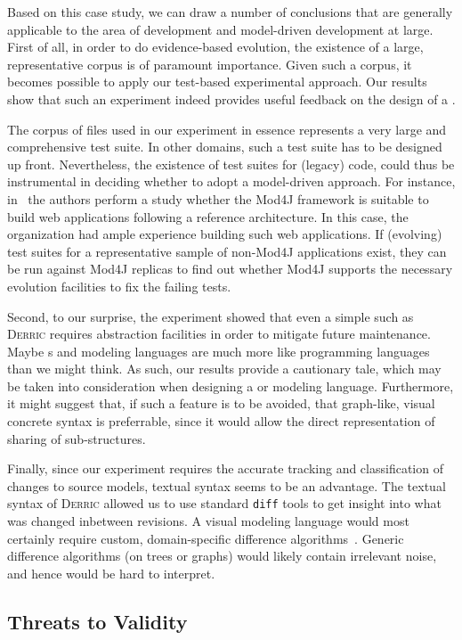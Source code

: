 \documentclass[a4paper]{llncs}
\def\derric{\textsc{Derric}\xspace}
\newcommand{\DSL}{\textsmaller{DSL}\xspace}
\begin{document}
Based on this case study, we can draw a number of conclusions that are generally applicable to the area of \DSL development and model-driven development at large. 
First of all, in order to do evidence-based \DSL evolution, the existence of a large, representative corpus is of paramount importance. 
Given such a corpus, it becomes possible to apply our test-based experimental approach. 
Our results show that such an experiment indeed provides useful feedback on the design of a \DSL. 

The corpus of files used in our experiment in essence represents a very large and comprehensive test suite. 
In other domains, such a test suite has to be designed up front. 
Nevertheless, the existence of test suites for (legacy) code, could thus be instrumental in deciding whether to adopt a model-driven approach. 
For instance, in~\cite{mod4j} the authors perform a study whether the Mod4J framework is suitable to build web applications following a reference architecture. 
In this case, the organization had ample experience building such web applications. 
If (evolving) test suites for a representative sample of non-Mod4J applications exist, they can be run against Mod4J replicas to find out whether Mod4J supports the necessary evolution facilities to fix the failing tests.

Second, to our surprise, the experiment showed that even a simple \DSL such as \derric requires abstraction facilities in order to mitigate future maintenance.
Maybe \DSL{}s and modeling languages are much more like programming languages than we might think. 
As such, our results provide a cautionary tale, which may be taken into consideration when designing a \DSL or modeling language. 
Furthermore, it might suggest that, if such a feature is to be avoided, that graph-like, visual concrete syntax is preferrable, since it would allow the direct representation of sharing of sub-structures.

Finally, since our experiment requires the accurate tracking and classification of changes to source models, textual syntax seems to be
an advantage. 
The textual syntax of \derric allowed us to use standard \texttt{diff} tools to get insight into what was changed inbetween revisions. 
A visual modeling language would most certainly require custom, domain-specific difference algorithms~\cite{UMLDiff}. 
Generic difference algorithms (on trees or graphs) would likely contain irrelevant noise, and hence would be hard to interpret.

\subsection{Threats to Validity}
\end{document}
